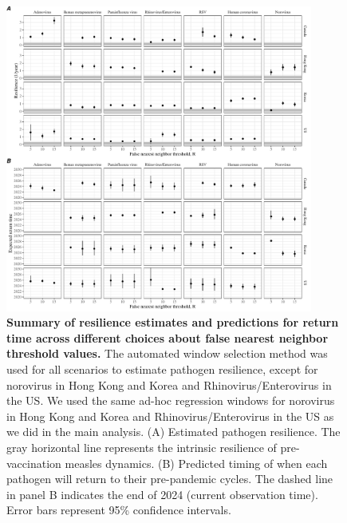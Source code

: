 \documentclass[12pt]{article}
\begin{document}
\pagebreak

\begin{figure}[!th]
\begin{center}
\includegraphics[width=0.9\textwidth]{../figure4_R/figure4_R.pdf}
\caption{
\textbf{Summary of resilience estimates and predictions for return time across different choices about false nearest neighbor threshold values.}
The automated window selection method was used for all scenarios to estimate pathogen resilience, except for norovirus in Hong Kong and Korea and Rhinovirus/Enterovirus in the US.
We used the same ad-hoc regression windows for norovirus in Hong Kong and Korea and Rhinovirus/Enterovirus in the US as we did in the main analysis.
(A) Estimated pathogen resilience.
The gray horizontal line represents the intrinsic resilience of pre-vaccination measles dynamics.
(B) Predicted timing of when each pathogen will return to their pre-pandemic cycles.
The dashed line in panel B indicates the end of 2024 (current observation time).
Error bars represent 95\% confidence intervals.
}
\end{center}
\end{figure}

\pagebreak
\end{document}
